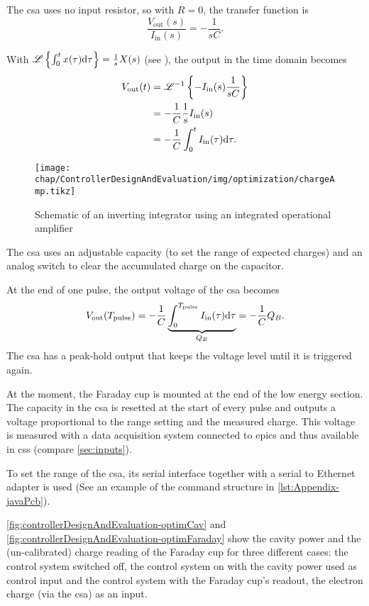 The \gls{csa} uses no input resistor, so with $R=0$, the transfer function is
\begin{equation}
\frac{V_\text{out}(s)}{I_\text{in}(s)} = -\frac{1}{sC}.
\end{equation}

With $\mathscr{L}\left\{\int_{0}^{t} x(\tau) \text{d}{\tau}\right\}=\frac{1}{s} X(s)$ (see \cite{Leon2015}), the output in the time domain becomes
\begin{align}
V_\text{out}(t) &= \mathscr{L}^{-1}\left\{-I_\text{in}(s) \frac{1}{sC}\right\}\\
                &= -\frac{1}{C} \frac{1}{s} I_\text{in}(s)\\
                &= -\frac{1}{C} \int_{0}^{t} I_\text{in}(\tau) \text{d}{\tau}.
\end{align}

\begin{figure}[tb]
	\centering
	\texttt{[image: chap/ControllerDesignAndEvaluation/img/optimization/chargeAmp.tikz]}
	\caption[Inverting integrator schematic]{Schematic of an inverting integrator using an integrated operational amplifier}
	\label{fig:controllerDesignAndEvaluation-integrator}
\end{figure}

The \gls{csa} uses an adjustable capacity (to set the range of expected charges) and an analog switch to clear the accumulated charge on the capacitor.

At the end of one pulse, the output voltage of the \gls{csa} becomes
\begin{equation}
V_\text{out}(T_\text{pulse}) = -\frac{1}{C} \underbrace{\int_{0}^{T_\text{pulse}} I_\text{in}(\tau) \text{d}{\tau}}_{Q_B} = -\frac{1}{C} Q_B.
\end{equation}
The \gls{csa} has a peak-hold output that keeps the voltage level until it is triggered again.

At the moment, the Faraday cup is mounted at the end of the low energy section. The capacity in the \gls{csa} is resetted at the start of every pulse and outputs a voltage proportional to the range setting and the measured charge. This voltage is measured with a data acquisition system connected to \gls{epics} and thus available in \gls{css} (compare \autoref{sec:inputs}).

To set the range of the \gls{csa}, its serial interface together with a serial to Ethernet adapter is used (See an example of the command structure in \autoref{lst:Appendix-javaPcb}).

\autoref{fig:controllerDesignAndEvaluation-optimCav} and \autoref{fig:controllerDesignAndEvaluation-optimFaraday} show the cavity power and the (un-calibrated) charge reading of the Faraday cup for three different cases: the control system switched off, the control system on with the cavity power used as control input and the control system with the Faraday cup's readout, the electron charge (via the \gls{csa}) as an input.

